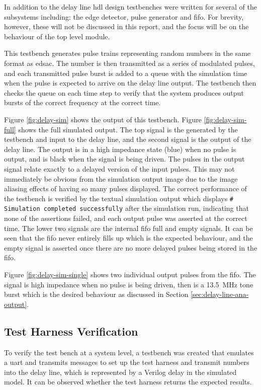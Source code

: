 In addition to the delay line \gls{hdl} design testbenches were written for several of the subsystems including: the edge detector, pulse generator and \gls{fifo}. For brevity, however, these will not be discussed in this report, and the focus will be on the behaviour of the top level module.

This testbench generates pulse trains representing random numbers in the same format as \gls{edsac}. The number is then transmitted as a series of modulated pulses, and each transmitted pulse burst is added to a queue with the simulation time when the pulse is expected to arrive on the delay line output. The testbench then checks the queue on each time step to verify that the system produces output bursts of the correct frequency at the correct time.
 
Figure \ref{fig:delay-sim} shows the output of this testbench. Figure \ref{fig:delay-sim-full} shows the full simulated output. The top signal is the generated by the testbench and input to the delay line, and the second signal is the output of the delay line. The output is in a high impedance state (blue) when no pulse is output, and is black when the signal is being driven. The pulses in the output signal relate exactly to a delayed version of the input pulses. This may not immediately be obvious from the simulation output image due to the image aliasing effects of having so many pulses displayed. The correct performance of the testbench is verified by the textual simulation output which displays \texttt{\# Simulation completed successfully} after the simulation run, indicating that none of the assertions failed, and each output pulse was asserted at the correct time. The lower two signals are the internal \gls{fifo} full and empty signals. It can be seen that the \gls{fifo} never entirely fills up which is the expected behaviour, and the empty signal is asserted once there are no more delayed pulses being stored in the \gls{fifo}.
 
Figure \ref{fig:delay-sim-single} shows two individual output pulses from the \gls{fifo}. The signal is high impedance when no pulse is being driven, then is a \SI{13.5}{\mega\hertz} tone burst which is the desired behaviour as discussed in Section \ref{sec:delay-line-ana-output}.

\subsection{Test Harness Verification}
To verify the test bench at a system level, a testbench was created that emulates a \gls{uart} and transmits messages to set up the test harness and transmit numbers into the delay line, which is represented by a Verilog delay in the simulated model. It can be observed whether the test harness returns the expected results.

